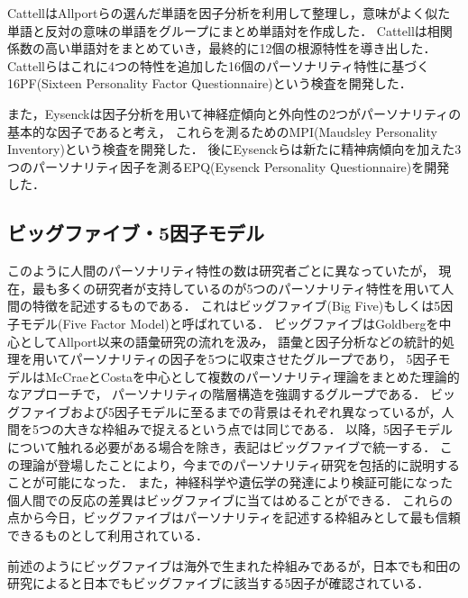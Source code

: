 Cattell\cite{cattell}はAllportらの選んだ単語を因子分析を利用して整理し，意味がよく似た単語と反対の意味の単語をグループにまとめ単語対を作成した．
Cattellは相関係数の高い単語対をまとめていき，最終的に12個の根源特性を導き出した．
Cattellら\cite{16pf}はこれに4つの特性を追加した16個のパーソナリティ特性に基づく16PF(Sixteen Personality Factor Questionnaire)という検査を開発した．

また，Eysenck\cite{mpi}は因子分析を用いて神経症傾向と外向性の2つがパーソナリティの基本的な因子であると考え，
これらを測るためのMPI(Maudsley Personality Inventory)という検査を開発した．
後にEysenckら\cite{epq}は新たに精神病傾向を加えた3つのパーソナリティ因子を測るEPQ(Eysenck Personality Questionnaire)を開発した．

\subsection{ビッグファイブ・5因子モデル}
このように人間のパーソナリティ特性の数は研究者ごとに異なっていたが，
現在，最も多くの研究者が支持しているのが5つのパーソナリティ特性を用いて人間の特徴を記述するものである．
これはビッグファイブ(Big Five)もしくは5因子モデル(Five Factor Model)と呼ばれている．
ビッグファイブはGoldberg\cite{goldberg-1981, goldberg-1990, goldberg-1992}を中心としてAllport以来の語彙研究の流れを汲み，
語彙と因子分析などの統計的処理を用いてパーソナリティの因子を5つに収束させたグループであり，
5因子モデルはMcCraeとCosta\cite{mccrae-1987, mccrae-1992}を中心として複数のパーソナリティ理論をまとめた理論的なアプローチで，
パーソナリティの階層構造を強調するグループである\cite{first-personality}．
ビッグファイブおよび5因子モデルに至るまでの背景はそれぞれ異なっているが，人間を5つの大きな枠組みで捉えるという点では同じである．
以降，5因子モデルについて触れる必要がある場合を除き，表記はビッグファイブで統一する．
この理論が登場したことにより，今までのパーソナリティ研究を包括的に説明することが可能になった．
また，神経科学や遺伝学の発達により検証可能になった個人間での反応の差異はビッグファイブに当てはめることができる．
これらの点から今日，ビッグファイブはパーソナリティを記述する枠組みとして最も信頼できるものとして利用されている．

前述のようにビッグファイブは海外で生まれた枠組みであるが，日本でも和田\cite{wada}の研究によると日本でもビッグファイブに該当する5因子が確認されている．

